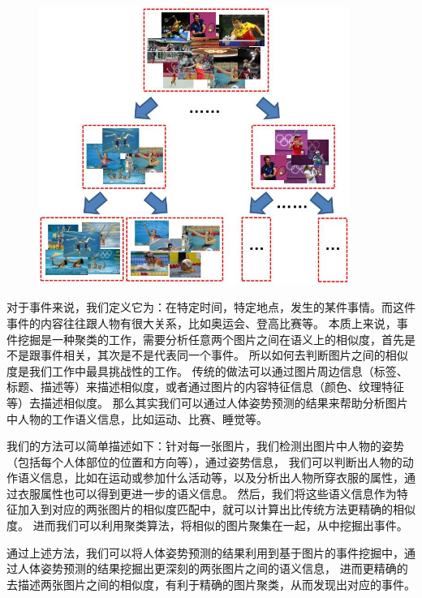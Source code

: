 \begin{figure}
\centering
\includegraphics[width=0.9\textwidth]{img/lhed-example.jpg}
\label{fig:lhed}
\end{figure}

对于事件来说，我们定义它为：在特定时间，特定地点，发生的某件事情。而这件事件的内容往往跟人物有很大关系，比如奥运会、登高比赛等。
本质上来说，事件挖掘是一种聚类的工作，需要分析任意两个图片之间在语义上的相似度，首先是不是跟事件相关，其次是不是代表同一个事件。
所以如何去判断图片之间的相似度是我们工作中最具挑战性的工作。
传统的做法可以通过图片周边信息（标签、标题、描述等）来描述相似度，或者通过图片的内容特征信息（颜色、纹理特征等）去描述相似度。
那么其实我们可以通过人体姿势预测的结果来帮助分析图片中人物的工作语义信息，比如运动、比赛、睡觉等。

我们的方法可以简单描述如下：针对每一张图片，我们检测出图片中人物的姿势（包括每个人体部位的位置和方向等），通过姿势信息，
我们可以判断出人物的动作语义信息，比如在运动或参加什么活动等，以及分析出人物所穿衣服的属性，通过衣服属性也可以得到更进一步的语义信息。
然后，我们将这些语义信息作为特征加入到对应的两张图片的相似度匹配中，就可以计算出比传统方法更精确的相似度。
进而我们可以利用聚类算法，将相似的图片聚集在一起，从中挖掘出事件。



通过上述方法，我们可以将人体姿势预测的结果利用到基于图片的事件挖掘中，通过人体姿势预测的结果挖掘出更深刻的两张图片之间的语义信息，
进而更精确的去描述两张图片之间的相似度，有利于精确的图片聚类，从而发现出对应的事件。

